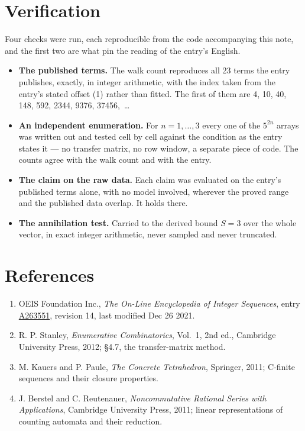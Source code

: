 \documentclass[11pt]{article}
\theoremstyle{definition}
\begin{document}
\section{Verification}

Four checks were run, each reproducible from the code accompanying this note, and the first two are what pin the reading of the entry's English.

\begin{itemize}

\item {\bfseries The published terms.} The walk count reproduces all 23 terms the entry publishes, exactly, in integer arithmetic, with the index taken from the entry's stated offset (1) rather than fitted. The first of them are 4, 10, 40, 148, 592, 2344, 9376, 37456,~\dots

\item {\bfseries An independent enumeration.} For $n = 1,\dots,3$ every one of the $5^{2n}$ arrays was written out and tested cell by cell against the condition as the entry states it --- no transfer matrix, no row window, a separate piece of code. The counts agree with the walk count and with the entry.

\item {\bfseries The claim on the raw data.} Each claim was evaluated on the entry's published terms alone, with no model involved, wherever the proved range and the published data overlap. It holds there.

\item {\bfseries The annihilation test.} Carried to the derived bound $S = 3$ over the whole vector, in exact integer arithmetic, never sampled and never truncated.

\end{itemize}

\section{References}

\begin{enumerate}

\item OEIS Foundation Inc., \emph{The On-Line Encyclopedia of Integer Sequences}, entry \href{https://oeis.org/A263551}{A263551}, revision 14, last modified Dec 26 2021.

\item R. P. Stanley, \emph{Enumerative Combinatorics}, Vol.~1, 2nd ed., Cambridge University Press, 2012; \S4.7, the transfer-matrix method.

\item M. Kauers and P. Paule, \emph{The Concrete Tetrahedron}, Springer, 2011; C-finite sequences and their closure properties.

\item J. Berstel and C. Reutenauer, \emph{Noncommutative Rational Series with Applications}, Cambridge University Press, 2011; linear representations of counting automata and their reduction.

\end{enumerate}
\end{document}
